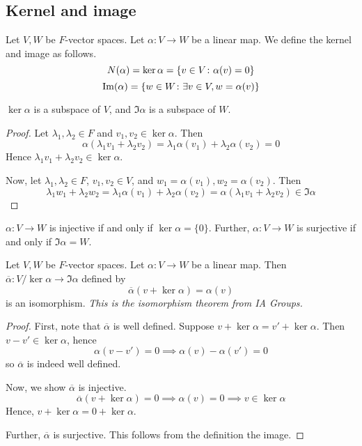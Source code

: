 \subsection{Kernel and image}
\begin{definition}
	Let \( V, W \) be \( F \)-vector spaces.
	Let \( \alpha \colon V \to W \) be a linear map.
	We define the kernel and image as follows.
	\[
		N(\alpha) = \ker\alpha = \qty{v \in V \colon \alpha(v) = 0}
	\]
	\[
		\operatorname{Im}(\alpha) = \qty{w \in W \colon \exists v \in V, w = \alpha(v)}
	\]
\end{definition}
\begin{lemma}
	\( \ker \alpha \) is a subspace of \( V \), and \( \Im \alpha \) is a subspace of \( W \).
\end{lemma}
\begin{proof}
	Let \( \lambda_1, \lambda_2 \in F \) and \( v_1, v_2 \in \ker \alpha \).
	Then
	\[
		\alpha(\lambda_1 v_1 + \lambda_2 v_2) = \lambda_1 \alpha(v_1) + \lambda_2 \alpha(v_2) = 0
	\]
	Hence \( \lambda_1 v_1 + \lambda_2 v_2 \in \ker \alpha \).

	Now, let \( \lambda_1, \lambda_2 \in F \), \( v_1, v_2 \in V \), and \( w_1 = \alpha(v_1), w_2 = \alpha(v_2) \).
	Then
	\[
		\lambda_1 w_1 + \lambda_2 w_2 = \lambda_1 \alpha(v_1) + \lambda_2 \alpha(v_2) = \alpha(\lambda_1 v_1 + \lambda_2 v_2) \in \Im \alpha
	\]
\end{proof}
\begin{remark}
	\( \alpha \colon V \to W \) is injective if and only if \( \ker \alpha = \{ 0 \} \).
	Further, \( \alpha \colon V \to W \) is surjective if and only if \( \Im \alpha = W \).
\end{remark}
\begin{theorem}
	Let \( V, W \) be \( F \)-vector spaces.
	Let \( \alpha \colon V \to W \) be a linear map.
	Then \( \overline \alpha \colon V / \ker \alpha \to \Im \alpha \) defined by
	\[
		\overline \alpha (v + \ker \alpha) = \alpha(v)
	\]
	is an isomorphism.
	\textit{This is the isomorphism theorem from IA Groups.}
\end{theorem}
\begin{proof}
	First, note that \( \overline\alpha \) is well defined.
	Suppose \( v + \ker \alpha = v' + \ker \alpha \).
	Then \( v - v' \in \ker \alpha \), hence
	\[
		\alpha(v - v') = 0 \implies \alpha(v) - \alpha(v') = 0
	\]
	so \( \overline\alpha \) is indeed well defined.

	Now, we show \( \overline\alpha \) is injective.
	\[
		\overline\alpha(v + \ker \alpha) = 0 \implies \alpha(v) = 0 \implies v \in \ker \alpha
	\]
	Hence, \( v + \ker \alpha = 0 + \ker \alpha \).

	Further, \( \overline\alpha \) is surjective.
	This follows from the definition the image.
\end{proof}

